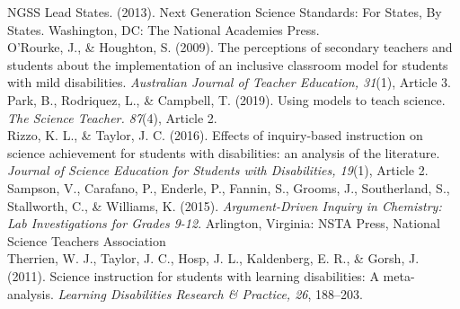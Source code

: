 \documentclass[11pt]{sig-alternate}
\begin{document}
\begin{large}
NGSS Lead States. (2013). Next Generation Science Standards: For States, By States. Washington, DC: The National Academies Press.\\

O’Rourke, J., \& Houghton, S. (2009). The perceptions of secondary teachers and students about the implementation of an inclusive classroom model for students with mild disabilities.
\textit{Australian Journal of Teacher Education, 31}(1), Article 3.\\

Park, B., Rodriquez, L., \& Campbell, T. (2019). Using models to teach science. \textit{The Science Teacher. 87}(4), Article 2.\\

Rizzo, K. L., \& Taylor, J. C. (2016). Effects of inquiry-based instruction on science achievement for students with disabilities: an analysis of the literature. \textit{Journal of Science Education for Students with Disabilities, 19}(1), Article 2.\\

Sampson, V., Carafano, P., Enderle, P., Fannin, S., Grooms, J., Southerland, S., Stallworth, C., \& Williams, K. (2015). \textit{Argument-Driven Inquiry in Chemistry: Lab Investigations for Grades 9-12}. Arlington, Virginia: NSTA Press, National Science Teachers Association\\

Therrien, W. J., Taylor, J. C., Hosp, J. L., Kaldenberg, E. R., \& Gorsh, J. (2011). Science instruction for students with learning disabilities: A meta-analysis. \textit{Learning Disabilities Research \& Practice, 26}, 188–203.

\end{large}
\end{document}
